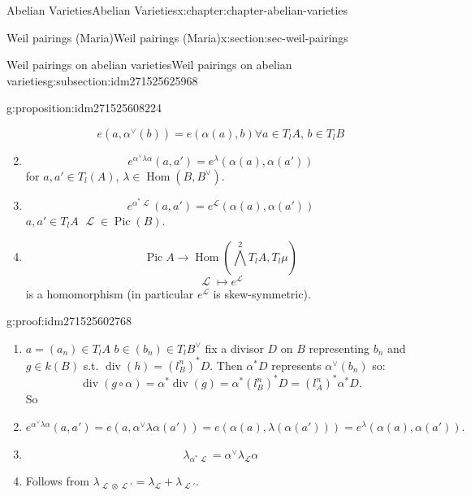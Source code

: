 \documentclass[oneside,10pt,]{book}
\numberwithin{equation}{section}
\newcommand{\sheaf}[1]{\operatorname{\mathcal{#1}}}
\DeclareMathOperator{\Hom}{Hom}
\DeclareMathOperator{\divisor}{div}
\DeclareMathOperator{\Pic}{Pic}
\begin{document}
\begin{chapterptx}{Abelian Varieties}{}{Abelian Varieties}{}{}{x:chapter:chapter-abelian-varieties}
\begin{sectionptx}{Weil pairings (Maria)}{}{Weil pairings (Maria)}{}{}{x:section:sec-weil-pairings}
\begin{subsectionptx}{Weil pairings on abelian varieties}{}{Weil pairings on abelian varieties}{}{}{g:subsection:idm271525625968}
\begin{proposition}{}{}{g:proposition:idm271525608224}
\begin{enumerate}
\begin{equation*}
e(a,\alpha^\vee(b)) = e(\alpha (a), b) \forall a \in T_lA,\,b\in T_l B
\end{equation*}
%
\item{}%
\begin{equation*}
e^{\alpha^\vee \lambda \alpha}(a,a') = e ^\lambda (\alpha(a), \alpha(a'))
\end{equation*}
for \(a,a' \in T_l(A)\), \(\lambda \in \Hom(B,B^\vee)\).%
\item{}%
\begin{equation*}
e^{\alpha^* \sheaf L} (a,a') = e^{\sheaf L}(\alpha (a),\alpha(a'))
\end{equation*}
\(a,a'\in T_lA\) \(\sheaf L\in \Pic(B)\).%
\item{}%
\begin{equation*}
\Pic A  \to \Hom( \bigwedge^2 T_lA , T_l\mu)
\end{equation*}
%
\begin{equation*}
\sheaf L \mapsto e^{\sheaf L}
\end{equation*}
is a homomorphism (in particular \(e^{\sheaf L}\) is  skew-symmetric).%
\end{enumerate}
%
\end{proposition}
\begin{proofptx}{}{g:proof:idm271525602768}
%
\begin{enumerate}
\item{}\(a = (a_n) \in T_lA\) \(b\in (b_n) \in T_l B^\vee\) fix a divisor \(D \) on \(B\) representing \(b_n\) and \(g\in k(B)\) s.t. \(\divisor (h) = (l^n_B)^* D\). Then \(\alpha^* D\) represents \(\alpha^\vee(b_n)\) so:%
\begin{equation*}
\divisor(g\circ \alpha) = \alpha^*\divisor (g) = \alpha^*(l^n_B)^* D = (l_A^n)^* \alpha^* D\text{.}
\end{equation*}
So%
\item{}%
\begin{equation*}
e^{\alpha^{\vee}\lambda \alpha} (a,a') = e(a, \alpha^\vee\lambda \alpha(a')) = e(\alpha(a),\lambda (\alpha(a'))) = e^\lambda (\alpha(a), \alpha(a'))\text{.}
\end{equation*}
%
\item{}%
\begin{equation*}
\lambda_{\alpha^* \sheaf L} = \alpha^\vee \lambda_{\sheaf L} \alpha
\end{equation*}
%
\item{}Follows from \(\lambda_{\sheaf L\otimes \sheaf L'} = \lambda_{\sheaf L} + \lambda_{\sheaf L'}\).%
\end{enumerate}

\end{proofptx}
\end{subsectionptx}
\end{sectionptx}
\end{chapterptx}
\end{document}
